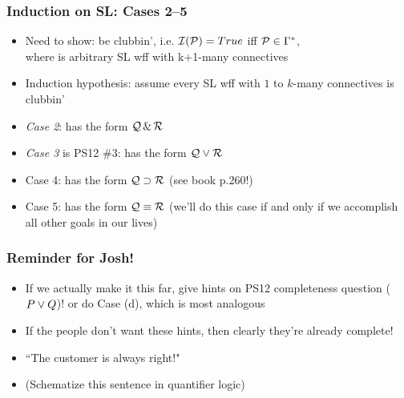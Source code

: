 \begin{frame}
\frametitle{Induction on SL: Cases 2--5}

\begin{itemize}[<+->]

\item Need to show:  be clubbin', i.e. $\mathcal{I}(\mathcal{P}) = True$ iff $\mathcal{P} \in \Gamma^{\ast}$, \\ where  is arbitrary SL wff with k+1-many connectives

\item \alert{Induction hypothesis}: assume every SL wff with $1$ to $k$-many connectives is clubbin' 

\item \emph{Case 2}:  has the form $\mathcal{Q} \,\&\, \mathcal{R}$


\item \emph{Case 3} is PS12 \#3:  has the form $\mathcal{Q} \vee \mathcal{R}$

\item Case 4:  has the form $\mathcal{Q} \supset \mathcal{R}$ (see book p.260!)

\item Case 5:  has the form $\mathcal{Q} \equiv \mathcal{R}$ (we'll do this case if and only if we accomplish all other goals in our lives)



\end{itemize}
\end{frame}


\begin{frame}
\frametitle{Reminder for Josh!}

\begin{itemize}[<+->]

\item If we actually make it this far, give hints on PS12 completeness question ($P \vee Q$)! or do Case (d), which is most analogous 

\item If the people don't want these hints, then clearly they're already complete!

\item ``The customer is always right!"

\item (Schematize this sentence in quantifier logic)


\end{itemize}
\end{frame}


